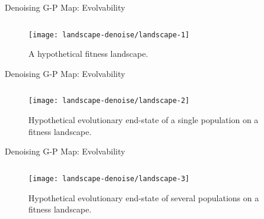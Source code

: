 \begin{frame}{Denoising G-P Map: Evolvability}

\begin{figure}

\begin{columns}
\begin{column}{0.6\textwidth}
  \texttt{[image: landscape-denoise/landscape-1]}%
\end{column}
\begin{column}{0.4\textwidth}
\caption{
A hypothetical fitness landscape.
}
\end{column}
\end{columns}

\end{figure}

\end{frame}
\begin{frame}{Denoising G-P Map: Evolvability}

\begin{figure}

\begin{columns}
\begin{column}{0.6\textwidth}
  \texttt{[image: landscape-denoise/landscape-2]}%
\end{column}
\begin{column}{0.4\textwidth}
\caption{
Hypothetical evolutionary end-state of a single population on a fitness landscape.
}
\end{column}
\end{columns}

\end{figure}

\end{frame}
\begin{frame}{Denoising G-P Map: Evolvability}

\begin{figure}

\begin{columns}
\begin{column}{0.6\textwidth}
  \texttt{[image: landscape-denoise/landscape-3]}%
\end{column}
\begin{column}{0.4\textwidth}
\caption{
Hypothetical evolutionary end-state of several populations on a fitness landscape.
}
\end{column}
\end{columns}

\end{figure}

\end{frame}
